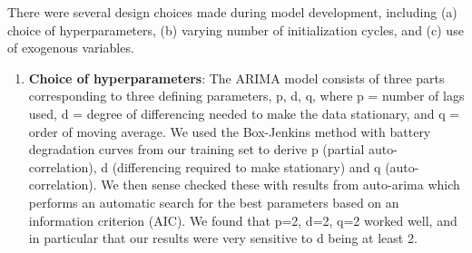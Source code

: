 \documentclass{article}
\begin{document}
There were several design choices made during model development, including (a) choice of hyperparameters, (b) varying number of initialization cycles, and (c) use of exogenous variables.  

\begin{enumerate}[label=(\alph*), leftmargin=.35in]
\item \textbf{Choice of hyperparameters}: The ARIMA model consists of three parts corresponding to three defining parameters, p, d, q, where p = number of lags used, d = degree of differencing needed to make the data stationary, and q = order of moving average. We used the Box-Jenkins method with battery degradation curves from our training set to derive p (partial auto-correlation), d (differencing required to make stationary) and q (auto-correlation). We then sense checked these with results from auto-arima\cite{pmdARIMA} which performs an automatic search for the best parameters based on an information criterion (AIC). We found that p=2, d=2, q=2 worked well, and in particular that our results were very sensitive to d being at least 2. 




\end{enumerate}
\end{document}
